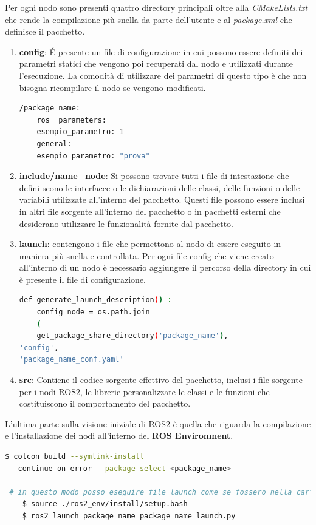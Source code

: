 Per ogni nodo sono presenti quattro directory principali oltre alla \textit{CMakeLists.txt} che rende la compilazione più snella da parte dell’utente e al \textit{package.xml} che definisce il pacchetto.
\begin{enumerate}
\item \textbf{config}: É presente un file di configurazione in cui possono essere definiti dei
 parametri statici che vengono poi recuperati dal nodo e utilizzati durante l’esecuzione. La comodità di utilizzare dei parametri di questo tipo è che non bisogna ricompilare il nodo se vengono modificati.
 
\begin{lstlisting}[language=bash, caption={Esempio di un file config}]
/package_name:
 	ros__parameters:
 	esempio_parametro: 1
 	general:
 	esempio_parametro: "prova"
\end{lstlisting}

\item \textbf{include/name\_node}: Si possono trovare tutti i file di intestazione che defini
scono le interfacce o le dichiarazioni delle classi, delle funzioni o delle variabili
 utilizzate all’interno del pacchetto. Questi file possono essere inclusi in altri file
 sorgente all’interno del pacchetto o in pacchetti esterni che desiderano utilizzare
 le funzionalità fornite dal pacchetto.
 
\item \textbf{launch}:  contengono i file che permettono al nodo di essere eseguito in maniera
 più snella e controllata. Per ogni file config che viene creato all’interno di un
 nodo è necessario aggiungere il percorso della directory in cui è presente il file di
 configurazione.
 
\begin{lstlisting}[language=bash, caption={Esempio di un file launch}]
def generate_launch_description() :
 	config_node = os.path.join
 	(
 	get_package_share_directory('package_name'),
'config',
'package_name_conf.yaml'

\end{lstlisting}
 \item \textbf{src}: Contiene il codice sorgente effettivo del pacchetto, inclusi i file sorgente per
 i nodi ROS2, le librerie personalizzate le classi e le funzioni che costituiscono il
 comportamento del pacchetto.
 
\end{enumerate}

L’ultima parte sulla visione iniziale di ROS2 è quella che riguarda la compilazione e
 l’installazione dei nodi all’interno del \textbf{ROS Environment}.
 
\begin{lstlisting}[language=bash, caption={ Compilazione di un pacchetto ROS e attivazione dell’Environment
}]
	$ colcon build --symlink-install
 --continue-on-error --package-select <package_name>
 
 # in questo modo posso eseguire file launch come se fossero nella cartella corrente
	$ source ./ros2_env/install/setup.bash
	$ ros2 launch package_name package_name_launch.py
\end{lstlisting}

